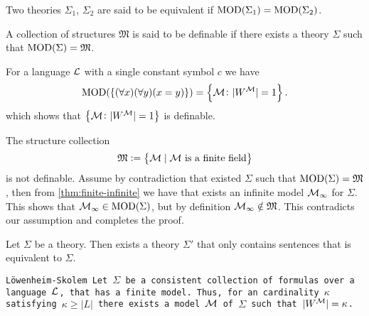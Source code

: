\documentclass[11pt,a4paper]{article}
\begin{document}
  \begin{definition}
    Two theories $\Sigma_1$, $\Sigma_2$ are said to be equivalent if
    $\operatorname{MOD}(\Sigma_1) = \operatorname{MOD}(\Sigma_2)$.
  \end{definition}

  \begin{definition}
    A collection of structures $\mathfrak M$ is said to be definable
    if there exists a theory $\Sigma$ such that $\operatorname{MOD}(\Sigma) = \mathfrak M$.
  \end{definition}

  \begin{example}
    For a language $\mathcal{L}$ with a single constant symbol $c$ we have
    \[
      \operatorname{MOD}(\{(\forall x)(\forall y)(x = y)\}) =
      \set{\mathcal{M}\colon |W^{\mathcal{M}}| = 1}.
    \]
    which shows that $\set{\mathcal{M}\colon |W^{\mathcal{M}}| = 1}$ is definable.
  \end{example}

  \begin{example}
    The structure collection
    \[ \mathfrak M := \set{\mathcal{M}\mid \text{$\mathcal{M}$ is a finite field}} \]
    is not definable.
    Assume by contradiction that existed $\Sigma$ such that 
    $\operatorname{MOD}(\Sigma) = \mathfrak M$, then from 
    \autoref{thm:finite-infinite}
    we have that exists an infinite model $\mathcal{M}_\infty$ for $\Sigma$.
    This shows that $\mathcal{M}_\infty \in \operatorname{MOD}(\Sigma)$, but by definition
    $\mathcal{M}_\infty \notin \mathfrak M$.
    This contradicts our assumption and completes the proof.
  \end{example}


  \begin{proposition}
    Let $\Sigma$ be a theory. Then exists a theory $\Sigma'$ that only contains
    sentences that is equivalent to $\Sigma$.
  \end{proposition}

  \begin{theorem}\tt{Löwenheim-Skolem}
    Let $\Sigma$ be a consistent collection of formulas over a language $\mathcal{L}$,
    that has a finite model. Thus, for an cardinality $\kappa$ satisfying
    $\kappa \geq |L|$ there exists a model $\mathcal{M}$ of $\Sigma$ such that
    $|W^{\mathcal{M}}| = \kappa$.
  \end{theorem}
\end{document}

